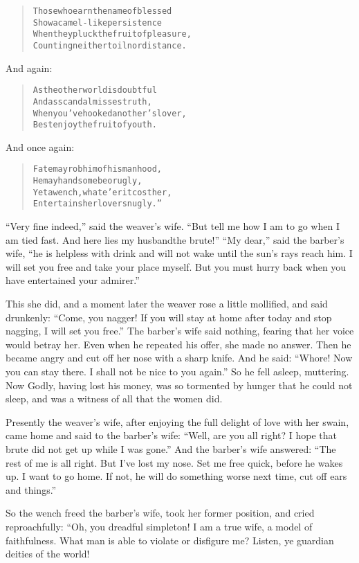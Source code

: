 \documentclass[article, twoside, 14pt]{memoir}
\renewenvironment{verbatim}{%
\begin{quote}%
\vskip -10pt%
\begin{alltt}\normalfont\large}{\end{alltt}%
\end{quote}%
\vskip -10pt
} %
\begin{document}
\begin{verbatim}
Those who earn the name of blessed
    Show a camel-like persistence
When they pluck the fruit of pleasure,
    Counting neither toil nor distance.
\end{verbatim}
And again:

\begin{verbatim}
As the other world is doubtful
    And as scandal misses truth,
When you've hooked another's lover,
    Best enjoy the fruit of youth.
\end{verbatim}
And once again:

\begin{verbatim}
Fate may rob him of his manhood,
He may handsome be or ugly,
Yet a wench, whate'er it cost her,
Entertains her lover snugly.”
\end{verbatim}
``Very fine indeed,'' said the weaver's wife.
``But tell me how I am to go when I am tied fast. And here lies my husband{\textemdash}the brute!''
``My dear,'' said the barber's wife,
``he is helpless with drink and will not wake until the sun's rays reach him. I will set you free and take your place myself. But you must hurry back when you have entertained your admirer.''

This she did, and a moment later the weaver rose a little
mollified, and said drunkenly:
``Come, you nagger! If you will stay at home after today and stop nagging, I will set you free.''
The barber's wife said nothing, fearing that her voice would betray
her. Even when he repeated his offer, she made no answer. Then he
became angry and cut off her nose with a sharp knife. And he said:
``Whore! Now you can stay there. I shall not be nice to you again.''
So he fell asleep, muttering. Now Godly, having lost his money, was
so tormented by hunger that he could not sleep, and was a witness
of all that the women did.

Presently the weaver's wife, after enjoying the full delight of
love with her swain, came home and said to the barber's wife:
``Well, are you all right? I hope that brute did not get up while I was gone.''
And the barber's wife answered:
``The rest of me is all right. But I've lost my nose. Set me free quick, before he wakes up. I want to go home. If not, he will do something worse next time, cut off ears and things.''

So the wench freed the barber's wife, took her former
position, and cried reproachfully: “Oh, you dreadful simpleton! I
am a true wife, a model of faithfulness. What man is able to
violate or disfigure me? Listen, ye guardian deities of the world!
\end{document}
